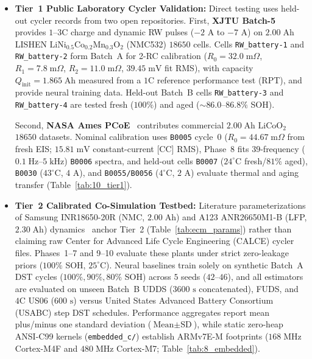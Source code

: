 \documentclass[10pt,a4paper]{article}
\begin{document}
\begin{itemize}
\item \textbf{Tier~1 Public Laboratory Cycler Validation:} Direct testing uses held-out cycler records from two open repositories. First, \textbf{XJTU Batch-5}~\cite{Wang2024xjtu} provides $1\text{--}3\text{C}$ charge and dynamic RW pulses ($-2\text{ A}$ to $-7\text{ A}$) on $2.00\;\mathrm{Ah}$ LISHEN $\text{LiNi}_{0.5}\text{Co}_{0.2}\text{Mn}_{0.3}\text{O}_2$ (NMC532) $18650$ cells. Cells \texttt{RW\_battery-1} and \texttt{RW\_battery-2} form Batch~A for 2-RC calibration ($R_0 = 32.0\;\mathrm{m}\Omega$, $R_1 = 7.8\;\mathrm{m}\Omega$, $R_2 = 11.0\;\mathrm{m}\Omega$, $39.45\;\mathrm{mV}$ fit RMS), with capacity $Q_{\text{init}} = 1.865\;\mathrm{Ah}$ measured from a $1\text{C}$ reference performance test (RPT), and provide neural training data. Held-out Batch~B cells \texttt{RW\_battery-3} and \texttt{RW\_battery-4} are tested fresh ($100\%$) and aged ($\sim 86.0\text{--}86.8\%$ SOH).

Second, \textbf{NASA Ames PCoE}~\cite{Saha2007nasa} contributes commercial $2.00\;\mathrm{Ah}$ $\text{LiCoO}_2$ $18650$ datasets. Nominal calibration uses \texttt{B0005} cycle~0 ($R_0 = 44.67\;\mathrm{m}\Omega$ from fresh EIS; $15.81\;\mathrm{mV}$ constant-current [CC] RMS), Phase~8 fits $39$-frequency ($0.1\;\mathrm{Hz}\text{--}5\;\mathrm{kHz}$) \texttt{B0006} spectra, and held-out cells \texttt{B0007} ($24^\circ\text{C}$ fresh/$81\%$ aged), \texttt{B0030} ($43^\circ\text{C}$, $4\text{ A}$), and \texttt{B0055/B0056} ($4^\circ\text{C}$, $2\text{ A}$) evaluate thermal and aging transfer (Table~\ref{tab:10_tier1}).
\item \textbf{Tier~2 Calibrated Co-Simulation Testbed:} Literature parameterizations of Samsung INR18650-20R (NMC, $2.00\;\mathrm{Ah}$) and A123 ANR26650M1-B (LFP, $2.30\;\mathrm{Ah}$) dynamics~\cite{He2011ecm,Hu2012ecm,Birkl2017diagnostics,Pecht2011calce} anchor Tier~2 (Table~\ref{tab:ecm_params}) rather than claiming raw Center for Advanced Life Cycle Engineering (CALCE) cycler files. Phases~1--7 and 9--10 evaluate these plants under strict zero-leakage priors ($100\%$ SOH, $25^\circ\text{C}$). Neural baselines train solely on synthetic Batch~A DST cycles ($100\%, 90\%, 80\%$ SOH) across $5$ seeds ($42\text{--}46$), and all estimators are evaluated on unseen Batch~B UDDS ($3600\text{ s}$ concatenated), FUDS, and $4\text{C}$ US06 ($600\text{ s}$) versus United States Advanced Battery Consortium (USABC) step DST schedules. Performance aggregates report mean plus/minus one standard deviation ($\text{Mean}\pm\text{SD}$), while static zero-heap ANSI-C99 kernels (\texttt{embedded\_c/}) establish ARMv7E-M footprints ($168\;\mathrm{MHz}$ Cortex-M4F and $480\;\mathrm{MHz}$ Cortex-M7; Table~\ref{tab:8_embedded}).
\end{itemize}
\end{document}
